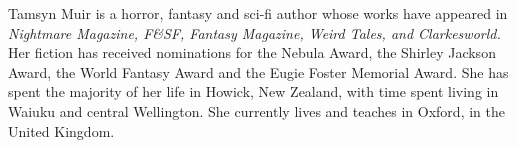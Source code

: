 {Tamsyn Muir} is a horror, fantasy and sci-fi author whose works have
appeared in \textit{Nightmare Magazine, F\&SF, Fantasy Magazine, Weird
  Tales, and Clarkesworld.} Her fiction has received nominations for
the Nebula Award, the Shirley Jackson Award, the World Fantasy Award
and the Eugie Foster Memorial Award. She has spent the majority of her
life in Howick, New Zealand, with time spent living in Waiuku and
central Wellington. She currently lives and teaches in Oxford, in the
United Kingdom.
